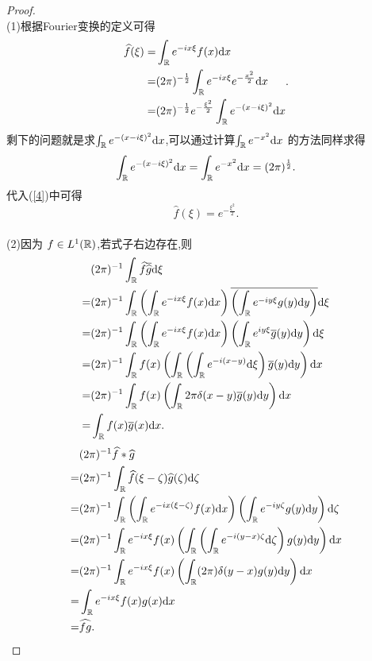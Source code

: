\begin{proof}\\
  (1)根据Fourier变换的定义可得
  \begin{equation}\label{4}
    \begin{aligned}
    \widehat{f}(\xi)=&\int_{\mathbb{R}}e^{-ix\xi}f(x)\mathrm{d}x\\
    =& (2\pi)^{-\frac{1}{2}} \int_{\mathbb{R}}e^{-ix\xi}e^{-\frac{x^2}{2}}\mathrm{d}x\\
    =&(2\pi)^{-\frac{1}{2}}e^{-\frac{\xi^2}{2}}\int_{\mathbb{R}} e^{-(x-i\xi)^2}\mathrm{d}x
    \end{aligned}
  .\end{equation}
  剩下的问题就是求$\int_{\mathbb{R}}e^{-(x-i\xi)^2}\mathrm{d}x$,可以通过计算$\int_{\mathbb{R}}e^{-x^2}\mathrm{d}x$ 的方法同样求得
  \[
    \int_{\mathbb{R}}e^{-(x-i\xi)^2}\mathrm{d}x=\int_{\mathbb{R}}e^{-x^2}\mathrm{d}x=(2\pi)^{\frac{1}{2}}.
  \] 
  代入(\ref{4})中可得
  \[
    \widehat{f}(\xi)=e^{-\frac{\xi^2}{2}}.
  \]\\
  (2)因为 $f\in L^{1}(\mathbb{R})$,若式子右边存在,则
  \begin{equation*}
    \begin{aligned} 
    &(2\pi)^{-1}\int_{\mathbb{R}}\widehat{f}\overline{\widehat{g}}\mathrm{d}\xi\\
    = &(2\pi)^{-1}\int_{\mathbb{R}}\left( \int_{\mathbb{R}}e^{-ix\xi}f(x)\mathrm{d}x \right)\overline{\left( \int_{\mathbb{R}}e^{-iy\xi}g(y)\mathrm{d}y \right)} \mathrm{d}\xi\\
    = &(2\pi)^{-1}\int_{\mathbb{R}}\left( \int_{\mathbb{R}}e^{-ix\xi}f(x)\mathrm{d}x \right)\left( \int_{\mathbb{R}}e^{iy\xi}\overline{g}(y)\mathrm{d}y \right) \mathrm{d}\xi\\
    =& (2\pi)^{-1}\int_{\mathbb{R}}f(x)\left(\int_{\mathbb{R}}\left( \int_{\mathbb{R}}e^{-i(x-y)}\mathrm{d}\xi \right)\overline{g}(y)\mathrm{d}y\right) \mathrm{d}x\\
    =&(2\pi)^{-1}\int_{\mathbb{R}}f(x)\left( \int_{\mathbb{R}}2\pi \delta(x-y) \overline{g}(y)\mathrm{d}y \right) \mathrm{d}x\\
    =&\int_{\mathbb{R}}f(x)\overline{g}(x)\mathrm{d}x.
    \end{aligned}
  \end{equation*}
\begin{equation*}
  \begin{aligned}
    &(2\pi)^{-1} \widehat{f}*\widehat{g}\\
    =&(2\pi)^{-1} \int_{\mathbb{R}}\widehat{f}(\xi-\zeta)\widehat{g}(\zeta)\mathrm{d}\zeta\\
    =& (2\pi)^{-1}\int_{\mathbb{R}}\left( \int_{\mathbb{R}}e^{-ix(\xi-\zeta)}f(x)\mathrm{d}x \right)\left( \int_{\mathbb{R}}e^{-iy\zeta}g(y)\mathrm{d}y \right)\mathrm{d}\zeta\\
    =& (2\pi)^{-1}\int_{\mathbb{R}}e^{-ix\xi}f(x)\left( \int_{\mathbb{R}} \left( \int_{\mathbb{R}}e^{-i(y-x)\zeta}\mathrm{d}\zeta \right)g(y) \mathrm{d}y \right) \mathrm{d}x\\
    =&(2\pi)^{-1}\int_{\mathbb{R}}e^{-ix\xi}f(x)\left( \int_{\mathbb{R}}(2\pi)\delta(y-x)g(y)\mathrm{d}y \right) \mathrm{d}x\\
    = & \int_{\mathbb{R}}e^{-ix\xi}f(x)g(x)\mathrm{d}x\\
    =& \widehat{fg}.
  \end{aligned}
\end{equation*}
\end{proof}




